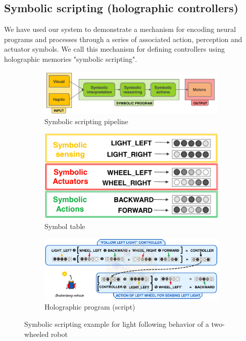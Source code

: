 \documentclass[conference]{IEEEtran}
\begin{document}
	

		\label{fig:visual-scene-exp}
	
\subsection{Symbolic scripting (holographic controllers)}

We have used our system to demonstrate a mechanism for encoding neural programs and processes through a series of associated action, perception and actuator symbols. We call this mechanism for defining controllers using holographic memories "symbolic scripting".


\begin{figure}[th!]
	\center
	\begin{subfigure}{1\columnwidth}
		\includegraphics[width=\columnwidth]{img/control_pipeline.png}
		\caption{Symbolic scripting pipeline}
		\label{fig:symbolic-scripting-a}
	\end{subfigure}
	
	
	\begin{subfigure}{0.7\columnwidth}
		\center
		\includegraphics[width=\columnwidth]{img/symbol_table.png}
		\caption{Symbol table}
		\label{fig:symbolic-scripting-b}
	\end{subfigure}
	\begin{subfigure}{1\columnwidth}
		\includegraphics[width=\columnwidth]{img/controller.png}
		\caption{Holographic program (script)}
		\label{fig:symbolic-scripting-c}
	\end{subfigure}
	\caption{Symbolic scripting example for light following behavior of a two-wheeled robot}
	\label{fig:symbolic-scripting}
\end{figure}
\end{document}
